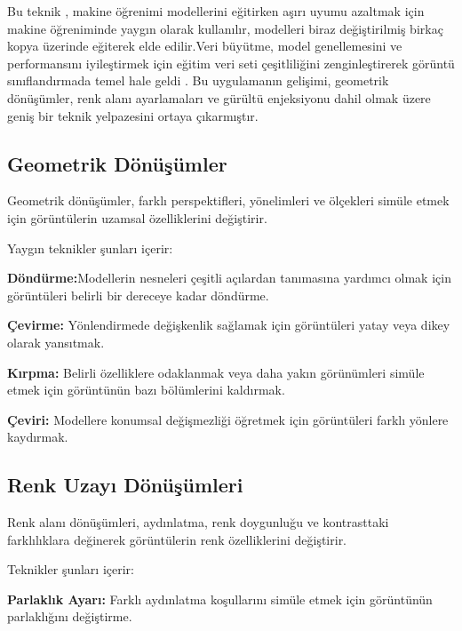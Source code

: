 \documentclass[11pt,a4paper]{report}
\begin{document}
\begin{justify}
 	Bu teknik , makine öğrenimi modellerini eğitirken aşırı uyumu azaltmak için makine öğreniminde yaygın olarak kullanılır, modelleri biraz değiştirilmiş birkaç kopya üzerinde eğiterek elde edilir.Veri büyütme, model genellemesini ve performansını iyileştirmek için eğitim veri seti çeşitliliğini zenginleştirerek görüntü sınıflandırmada temel hale geldi . Bu uygulamanın gelişimi, geometrik dönüşümler, renk alanı ayarlamaları ve gürültü enjeksiyonu dahil olmak üzere geniş bir teknik yelpazesini ortaya çıkarmıştır.
 	
 	\subsection{Geometrik Dönüşümler }
 	Geometrik dönüşümler, farklı perspektifleri, yönelimleri ve ölçekleri simüle etmek için görüntülerin uzamsal özelliklerini değiştirir.
 	\newline
 	
 	Yaygın teknikler şunları içerir:
 	\newline
 	
 	\textbf{Döndürme:}Modellerin nesneleri çeşitli açılardan tanımasına yardımcı olmak için görüntüleri belirli bir dereceye kadar döndürme.\newline
 	
 	\textbf{Çevirme:} Yönlendirmede değişkenlik sağlamak için görüntüleri yatay veya dikey olarak yansıtmak.\newline
 	
 	\textbf{Kırpma:} Belirli özelliklere odaklanmak veya daha yakın görünümleri simüle etmek için görüntünün bazı bölümlerini kaldırmak.\newline
 	
 	\textbf{Çeviri:} Modellere konumsal değişmezliği öğretmek için görüntüleri farklı yönlere kaydırmak.
 	\newpage
 	
 	\subsection{Renk Uzayı Dönüşümleri }
 	Renk alanı dönüşümleri, aydınlatma, renk doygunluğu ve kontrasttaki farklılıklara değinerek görüntülerin renk özelliklerini değiştirir.\newline
 	
 	Teknikler şunları içerir:\newline
 	
 	\textbf{Parlaklık Ayarı:} Farklı aydınlatma koşullarını simüle etmek için görüntünün parlaklığını değiştirme.\newline
 	

\end{justify}
\end{document}
